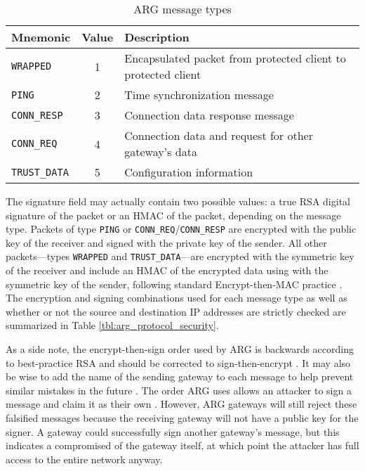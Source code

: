 \begin{table}
\caption{\ac{ARG} message types}
\label{tbl:arg_protocol_types}
\begin{tabular}{l|c|l}
\textbf{Mnemonic} & \textbf{Value} & \textbf{Description}\\
\hline
\texttt{WRAPPED} & 1 & Encapsulated packet from protected client to protected client\\
\texttt{PING} & 2 & Time synchronization message\\
\texttt{CONN\_RESP} & 3 & Connection data response message\\
\texttt{CONN\_REQ} & 4 & Connection data and request for other gateway's data\\ 
\texttt{TRUST\_DATA} & 5 & Configuration information 
\end{tabular}
\end{table}

\par The signature field may actually contain two possible values: a true \ac{RSA} digital signature of the packet or an \ac{HMAC} of the packet, depending on the message type. Packets of type \texttt{PING} or \texttt{CONN\_REQ}/\texttt{CONN\_RESP} are encrypted with the public key of the receiver and signed with the private key of the sender. All other packets---types \texttt{WRAPPED} and \texttt{TRUST\_DATA}---are encrypted with the symmetric key of the receiver and include an \ac{HMAC} of the encrypted data using with the symmetric key of the sender, following standard Encrypt-then-MAC practice \cite{AuthEncryptThenMAC}. The encryption and signing combinations used for each message type as well as whether or not the source and destination \ac{IP} addresses are strictly checked are summarized in Table \ref{tbl:arg_protocol_security}.

\par As a side note, the encrypt-then-sign order used by \ac{ARG} is backwards according to best-practice \ac{RSA} and should be corrected to sign-then-encrypt \cite{RobustPrinciplesPK}. It may also be wise to add the name of the sending gateway to each message to help prevent similar mistakes in the future \cite{EngPricCrypto}. The order \ac{ARG} uses allows an attacker to sign a message and claim it as their own \cite{rfc2633}. However, \ac{ARG} gateways will still reject these falsified messages because the receiving gateway will not have a public key for the signer. A gateway could successfully sign another gateway's message, but this indicates a compromised of the gateway itself, at which point the attacker has full access to the entire network anyway.

